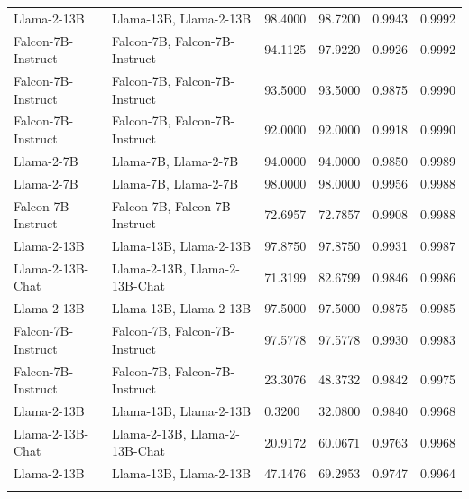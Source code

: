 \documentclass{article} %
\begin{document}
\begin{table}[htbp]
\begin{tabular}{llp{1.5cm}p{1.5cm}p{1.5cm}p{1.5cm}}
        Llama-2-13B            & Llama-13B, Llama-2-13B            & 98.4000       & 98.7200     & 0.9943         & 0.9992   \\
        Falcon-7B-Instruct     & Falcon-7B, Falcon-7B-Instruct     & 94.1125       & 97.9220     & 0.9926         & 0.9992   \\
        Falcon-7B-Instruct     & Falcon-7B, Falcon-7B-Instruct     & 93.5000       & 93.5000     & 0.9875         & 0.9990   \\
        Falcon-7B-Instruct     & Falcon-7B, Falcon-7B-Instruct     & 92.0000       & 92.0000     & 0.9918         & 0.9990   \\
        Llama-2-7B             & Llama-7B, Llama-2-7B              & 94.0000       & 94.0000     & 0.9850         & 0.9989   \\
        Llama-2-7B             & Llama-7B, Llama-2-7B              & 98.0000       & 98.0000     & 0.9956         & 0.9988   \\
        Falcon-7B-Instruct     & Falcon-7B, Falcon-7B-Instruct     & 72.6957       & 72.7857     & 0.9908         & 0.9988   \\
        Llama-2-13B            & Llama-13B, Llama-2-13B            & 97.8750       & 97.8750     & 0.9931         & 0.9987   \\
        Llama-2-13B-Chat       & Llama-2-13B, Llama-2-13B-Chat     & 71.3199       & 82.6799     & 0.9846         & 0.9986   \\
        Llama-2-13B            & Llama-13B, Llama-2-13B            & 97.5000       & 97.5000     & 0.9875         & 0.9985   \\
        Falcon-7B-Instruct     & Falcon-7B, Falcon-7B-Instruct     & 97.5778       & 97.5778     & 0.9930         & 0.9983   \\
        Falcon-7B-Instruct     & Falcon-7B, Falcon-7B-Instruct     & 23.3076       & 48.3732     & 0.9842         & 0.9975   \\
        Llama-2-13B            & Llama-13B, Llama-2-13B            & 0.3200        & 32.0800     & 0.9840         & 0.9968   \\
        Llama-2-13B-Chat       & Llama-2-13B, Llama-2-13B-Chat     & 20.9172       & 60.0671     & 0.9763         & 0.9968   \\
        Llama-2-13B            & Llama-13B, Llama-2-13B            & 47.1476       & 69.2953     & 0.9747         & 0.9964   \\   
\bottomrule
\label{ablation:other-scorers}
\end{tabular}
\end{table}
\end{document}
